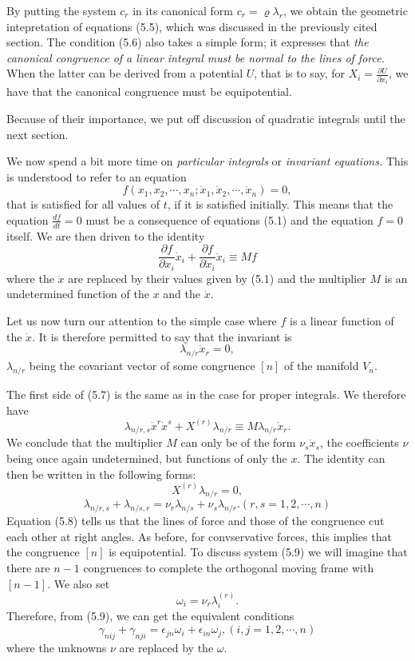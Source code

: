 \documentclass{book}
\begin{document}
By putting the system $c_r$ in its canonical form $c_r=\varrho\lambda_r$, we obtain the geometric intepretation of equations (5.5), which was discussed in the previously cited section. The condition (5.6) also takes a simple form; it expresses that \emph{the canonical congruence of a linear integral must be normal to the lines of force.} When the latter can be derived from a potential $U$, that is to say, for $X_i=\frac{\partial U}{\partial x_i}$, we have that the canonical congruence must be equipotential.

Because of their importance, we put off discussion of quadratic integrals until the next section. 

We now spend a bit more time on \emph{particular integrals} or \emph{invariant equations.} This is understood to refer to an equation
$$f(x_1,x_2,\cdots,x_n;\dot{x}_1,\dot{x}_2,\cdots,\dot{x}_n)=0,$$
that is satisfied for all values of $t$, if it is satisfied initially. This means that the equation $\frac{df}{dt}=0$ must be a consequence of equations (5.1) and the equation $f=0$ itself. We are then driven to the identity
\begin{equation}
\frac{\partial f}{\partial x_i}\dot{x}_i+\frac{\partial f}{\partial\dot{x}_i}\ddot{x}_i\equiv Mf
\end{equation} 
where the $\ddot{x}$ are replaced by their values given by (5.1) and the multiplier $M$ is an undetermined function of the $x$ and the $\dot{x}$.  

Let us now turn our attention to the simple case where $f$ is a linear function of the $\dot{x}$. It is therefore permitted to say that the invariant is
$$\lambda_{n/r}\dot{x}_r=0,$$
$\lambda_{n/r}$ being the covariant vector of some congruence $[n]$ of the manifold $V_n$. 

The first side of (5.7) is the same as in the case for proper integrals. We therefore have
$$\lambda_{n/r,s}\dot{x}^r\dot{x}^s+X^{(r)}\lambda_{n/r}\equiv M\lambda_{n/r}\dot{x}_r.$$
We conclude that the multiplier $M$ can only be of the form $\nu_s\dot{x}_s$, the coefficients $\nu$ being once again undetermined, but functions of only the $x$. The identity can then be written in the following forms:
\begin{equation}
X^{(r)}\lambda_{n/r}=0,
\end{equation}
\begin{equation}
\lambda_{n/r,s}+\lambda_{n/s,r}=\nu_r\lambda_{n/s}+\nu_s\lambda_{n/r}. (r,s=1,2,\cdots,n)
\end{equation}
Equation (5.8) tells us that the lines of force and those of the congruence cut each other at right angles. As before, for convservative forces, this implies that the congruence $[n]$ is equipotential. To discuss system (5.9) we will imagine that there are $n-1$ congruences to complete the orthogonal moving frame with $[n-1]$. We also set
$$\omega_i=\nu_r\lambda_i^{(r)}.$$
Therefore, from (5.9), we can get the equivalent conditions
\begin{equation*}
\gamma_{nij}+\gamma_{nji}=\epsilon_{jn}\omega_i+\epsilon_{in}\omega_j, (i,j=1,2,\cdots,n)
\tag{5.9'}
\end{equation*}
where the unknowns $\nu$ are replaced by the $\omega$. 
\end{document}
